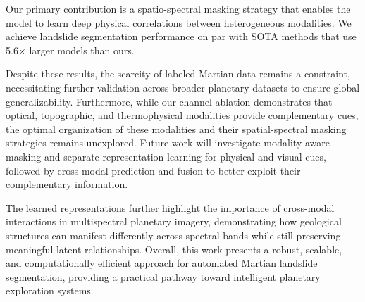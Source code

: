 Our primary contribution is a spatio-spectral masking strategy that enables the model to learn deep physical correlations between heterogeneous modalities. We achieve landslide segmentation performance on par with SOTA methods that use 5.6$\times$ larger models than ours.

Despite these results, the scarcity of labeled Martian data remains a constraint, necessitating further validation across broader planetary datasets to ensure global generalizability. Furthermore, while our channel ablation demonstrates that optical, topographic, and thermophysical modalities provide complementary cues, the optimal organization of these modalities and their spatial-spectral masking strategies remains unexplored. Future work will investigate modality-aware masking and separate representation learning for physical and visual cues, followed by cross-modal prediction and fusion to better exploit their complementary information.

The learned representations further highlight the importance of cross-modal interactions in multispectral planetary imagery, demonstrating how geological structures can manifest differently across spectral bands while still preserving meaningful latent relationships. Overall, this work presents a robust, scalable, and computationally efficient approach for automated Martian landslide segmentation, providing a practical pathway toward intelligent planetary exploration systems.

